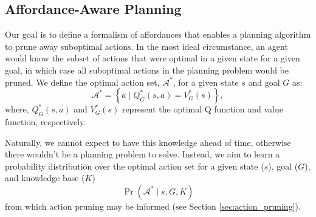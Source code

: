 \documentclass[conference]{IEEEtran}
\begin{document}


\subsection{Affordance-Aware Planning}


Our goal is to define a formalism of affordances that enables a planning algorithm
to prune away suboptimal actions. In the most ideal circumstance, an agent would
know the subset of actions that were optimal in a given state for a given goal, in 
which case all suboptimal actions in the planning problem would be pruned. 
We define the optimal action set, $\mathcal{A}^*$, for a given state $s$ and goal $G$ as:
\begin{equation}
\mathcal{A}^* = \left\{ a \mid Q^*_G(s,a) = V^*_G(s) \right\}, 
\label{eq:opt_act_set}
\end{equation}
where, $Q^*_G(s,a)$ and $V^*_G(s)$ represent the optimal Q function and 
value function, respectively. 

Naturally, we cannot expect to have this knowledge ahead of time, otherwise there wouldn't be a planning problem to solve. Instead, we aim to learn a probability distribution over the optimal action set for a given state ($s$), goal ($G$), and knowledge base ($K$)
\begin{equation}
\Pr(\mathcal{A}^* \mid s, G, K)
\label{eq:master}
\end{equation}
from which action pruning may be informed (see Section \ref{sec:action_pruning}).
\end{document}
